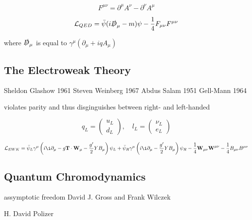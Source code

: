 \begin{equation}
F^{\mu \nu} = \partial^{\mu}A^{\nu} - \partial^{\nu}A^{\mu}
\end{equation}

\begin{equation}
\mathcal{L}_{QED} = \bar{\psi}(i \slashed{D}_{\mu} - m) \psi - \frac{1}{4}F_{\mu \nu}F^{\mu \nu}
\end{equation}

where $\slashed{D}_{\mu}$ is equal to $\gamma^{\mu}(\partial_{\mu} + iqA_{\mu})$

\subsection{The Electroweak Theory} \label{subsec-ElectroweakTheory}

Sheldon Glashow 1961 \cite{Glashow:1961tr}
Steven Weinberg 1967 \cite{PhysRevLett.19.1264}
Abdus Salam 1951 \cite{Salam:1959zz}
Gell-Mann 1964 \cite{GellMann:1964nj}

violates parity and thus disginguishes between right- and left-handed \cite{PhysRev.105.1413}

\begin{equation}
q_L = 
\begin{pmatrix}
u_L \\
d_L
\end{pmatrix}
,
\quad
l_L =
\begin{pmatrix}
\nu_L \\
e_L
\end{pmatrix}
\end{equation}

\begin{equation}
\lumi_{EWK} = \bar{\psi}_L \gamma^{\mu} \left(i \i\partial_{\mu} - g\textbf{T} \cdot \textbf{W}_{\mu} - \frac{g'}{2} Y B_{\mu}\right)\psi_L + \bar{\psi}_R \gamma^{\mu}\left(i \i\partial_{\mu} - \frac{g'}{2} Y B_{\mu}\right)\psi_R - \frac{1}{4}\textbf{W}_{\mu \nu}\textbf{W}^{\mu \nu} - \frac{1}{4} B_{\mu \nu} B^{\mu \nu} 
\end{equation}

\subsection{Quantum Chromodynamics} \label{subsec-QuantumChromodynamics}

assymptotic freedom David J. Gross and Frank Wilczek \cite{PhysRevD.8.3633}

H. David Polizer \cite{PhysRevLett.30.1346}

